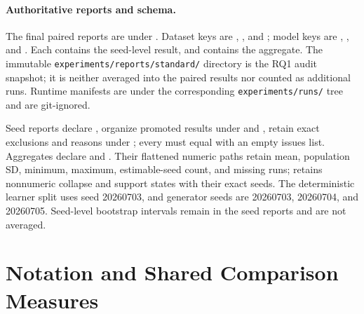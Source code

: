 \documentclass[10pt]{article}
\begin{document}
\paragraph{Authoritative reports and schema.}
\begin{sloppypar}
The final paired reports are under
.
Dataset keys are ,
, and ; model keys are
, , and
. Each 
contains the seed-level result, and  contains
the aggregate. The immutable \texttt{experiments/reports/standard/} directory
is the RQ1 audit snapshot; it is neither averaged into the paired results nor
counted as additional runs. Runtime manifests are under the corresponding
\texttt{experiments/runs/} tree and are git-ignored.

Seed reports declare
, organize promoted
results under  and
, retain exact
exclusions and reasons under
; every
 must equal  with an empty issues list.
Aggregates declare
 and
. Their flattened numeric paths
retain mean, population SD, minimum, maximum, estimable-seed count, and missing
runs;  retains nonnumeric collapse and support
states with their exact seeds.
The deterministic learner split uses seed 20260703, and generator seeds are
20260703, 20260704, and 20260705. Seed-level bootstrap intervals remain in the
seed reports and are not averaged.
\end{sloppypar}

\section{Notation and Shared Comparison Measures}
\label{sec:symbols}
\end{document}

